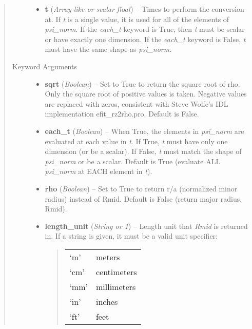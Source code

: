 \documentclass[letterpaper,10pt,english]{sphinxmanual}
\begin{document}
\begin{fulllineitems}
\begin{fulllineitems}
\begin{quote}
\begin{description}
\begin{itemize}
\item {} 
\textbf{t} (\emph{Array-like or scalar float}) --
Times to perform the conversion at.
If \emph{t} is a single value, it is used for all of the elements of
\emph{psi\_norm}. If the \emph{each\_t} keyword is True, then \emph{t} must be scalar
or have exactly one dimension. If the \emph{each\_t} keyword is False,
\emph{t} must have the same shape as \emph{psi\_norm}.

\end{itemize}

\item[{Keyword Arguments}] \leavevmode\begin{itemize}
\item {} 
\textbf{sqrt} (\emph{Boolean}) --
Set to True to return the square root of rho. Only
the square root of positive values is taken. Negative values are
replaced with zeros, consistent with Steve Wolfe's IDL
implementation efit\_rz2rho.pro. Default is False.

\item {} 
\textbf{each\_t} (\emph{Boolean}) --
When True, the elements in \emph{psi\_norm} are evaluated at
each value in \emph{t}. If True, \emph{t} must have only one dimension (or
be a scalar). If False, \emph{t} must match the shape of \emph{psi\_norm} or be
a scalar. Default is True (evaluate ALL \emph{psi\_norm} at EACH element in
\emph{t}).

\item {} 
\textbf{rho} (\emph{Boolean}) --
Set to True to return r/a (normalized minor radius)
instead of Rmid. Default is False (return major radius, Rmid).

\item {} 
\textbf{length\_unit} (\emph{String or 1}) --
Length unit that \emph{Rmid} is returned in.
If a string is given, it must be a valid unit specifier:
\begin{quote}

\begin{tabulary}{\linewidth}{|L|L|}
\hline

`m'
 & 
meters
\\

`cm'
 & 
centimeters
\\

`mm'
 & 
millimeters
\\

`in'
 & 
inches
\\

`ft'
 & 
feet
\\


\end{tabulary}
\end{quote}
\end{itemize}
\end{description}
\end{quote}
\end{fulllineitems}
\end{fulllineitems}
\end{document}
